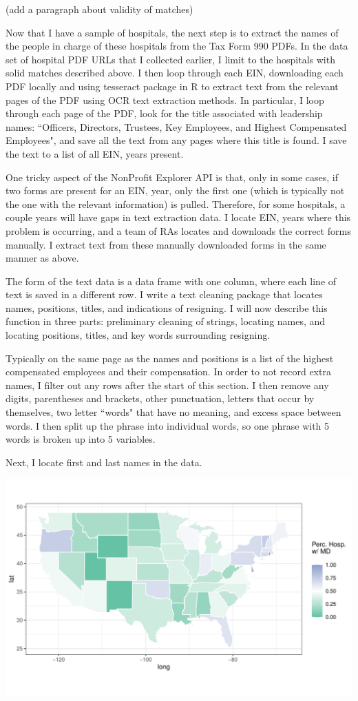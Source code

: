 \documentclass[12pt]{article}
\begin{document}
(add a paragraph about validity of matches)

 Now that I have a sample of hospitals, the next step is to extract the names of the people in charge of these hospitals from the Tax Form 990 PDFs. In the data set of hospital PDF URLs that I collected earlier, I limit to the hospitals with solid matches described above. I then loop through each EIN, downloading each PDF locally and using tesseract package in R to extract text from the relevant pages of the PDF using OCR text extraction methods. In particular, I loop through each page of the PDF, look for the title associated with leadership names: ``Officers, Directors, Trustees, Key Employees, and Highest Compensated Employees", and save all the text from any pages where this title is found. I save the text to a list of all EIN, years present. 

One tricky aspect of the NonProfit Explorer API is that, only in some cases, if two forms are present for an EIN, year, only the first one (which is typically not the one with the relevant information) is pulled. Therefore, for some hospitals, a couple years will have gaps in text extraction data. I locate EIN, years where this problem is occurring, and a team of RAs locates and downloads the correct forms manually. I extract text from these manually downloaded forms in the same manner as above. 

The form of the text data is a data frame with one column, where each line of text is saved in a different row. I write a text cleaning package that locates names, positions, titles, and indications of resigning. I will now describe this function in three parts: preliminary cleaning of strings, locating names, and locating positions, titles, and key words surrounding resigning. 

Typically on the same page as the names and positions is a list of the highest compensated employees and their compensation. In order to not record extra names, I filter out any rows after the start of this section. I then remove any digits, parentheses and brackets, other punctuation, letters that occur by themselves, two letter ``words" that have no meaning, and excess space between words. I then split up the phrase into individual words, so one phrase with 5 words is broken up into 5 variables. 

Next, I locate first and last names in the data. 

\includegraphics[width=\textwidth]{Objects/has_doc_avg_map.pdf}
\end{document}
